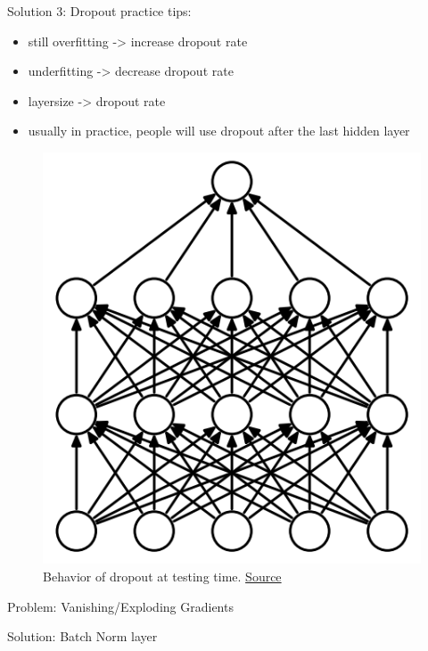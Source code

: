 \begin{frame}{Solution 3: Dropout}
	practice tips:
	\begin{itemize}
		\item still overfitting -> increase dropout rate
		\item underfitting -> decrease dropout rate
		\item layersize -> dropout rate
		\item usually in practice, people will use dropout after the last hidden layer
	\end{itemize}
	
	\begin{figure}[H]
		\centering
		\includegraphics[height=0.4\textheight]{Figs/Dropout-before.png}
		\caption{Behavior of dropout at testing time. \href{https://www.cs.toronto.edu/~hinton/absps/JMLRdropout.pdf}{Source}}
	\end{figure}
\end{frame}

\begin{frame}{Problem: Vanishing/Exploding Gradients}
    
\end{frame}

\begin{frame}{Solution: Batch Norm layer}
    
\end{frame}

